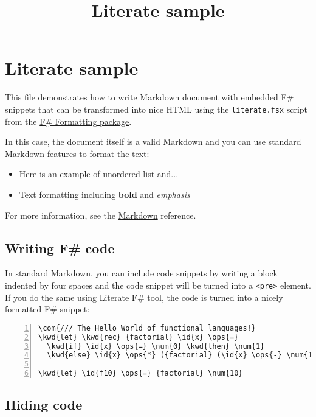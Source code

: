\documentclass{article}
\title{Literate sample
}
\date{}
\newcommand{\id}[1]{\textcolor{black}{#1}}
\newcommand{\com}[1]{\textcolor{officegreen}{#1}}
\newcommand{\kwd}[1]{\textcolor{navy}{#1}}
\newcommand{\num}[1]{\textcolor{officegreen}{#1}}
\newcommand{\ops}[1]{\textcolor{purple}{#1}}
\begin{document}
\maketitle

\section*{Literate sample}



This file demonstrates how to write Markdown document with 
embedded F\# snippets that can be transformed into nice HTML 
using the \texttt{literate.fsx} script from the \href{http://tpetricek.github.com/FSharp.Formatting}{F\# Formatting
package}.


In this case, the document itself is a valid Markdown and 
you can use standard Markdown features to format the text:
\begin{itemize}
\item Here is an example of unordered list and...

\item Text formatting including \textbf{bold} and \emph{emphasis}

\end{itemize}



For more information, see the \href{http://daringfireball.net/projects/markdown}{Markdown} reference.
\subsection*{Writing F\# code}



In standard Markdown, you can include code snippets by 
writing a block indented by four spaces and the code 
snippet will be turned into a \texttt{<pre>} element. If you do 
the same using Literate F\# tool, the code is turned into
a nicely formatted F\# snippet:
\begin{Verbatim}[commandchars=\\\{\}, numbers=left]
\com{/// The Hello World of functional languages!}
\kwd{let} \kwd{rec} {factorial} \id{x} \ops{=} 
  \kwd{if} \id{x} \ops{=} \num{0} \kwd{then} \num{1} 
  \kwd{else} \id{x} \ops{*} ({factorial} (\id{x} \ops{-} \num{1}))

\kwd{let} \id{f10} \ops{=} {factorial} \num{10}

\end{Verbatim}

\subsection*{Hiding code}
\end{document}
